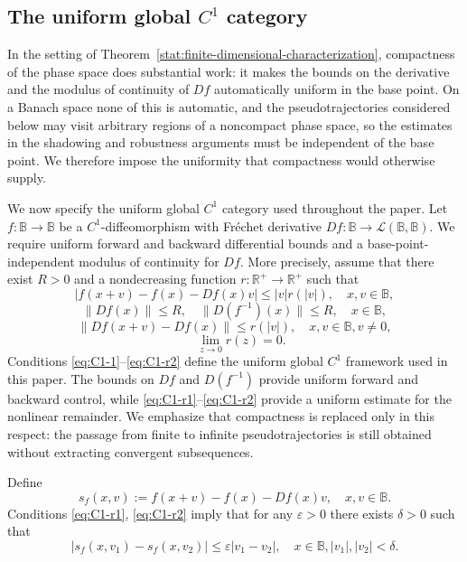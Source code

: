 \documentclass[12pt]{article}
\newcommand{\Bb}{\mathbb{B}}
\newcommand{\Rr}{\mathbb{R}}
\theoremstyle{definition}
\newtheorem{remark}[thm]{Remark}
\begin{document}
\subsection{The uniform global $C^1$ category}

In the setting of Theorem~\ref{stat:finite-dimensional-characterization}, compactness of the phase space does substantial work: it makes the bounds on the derivative and the modulus of continuity of $Df$ automatically uniform in the base point.
On a Banach space none of this is automatic, and the pseudotrajectories considered below may visit arbitrary regions of a noncompact phase space, so the estimates in the shadowing and robustness arguments must be independent of the base point. We therefore impose the uniformity that compactness would otherwise supply.

We now specify the uniform global $C^1$ category used throughout the paper. Let $f:\Bb\to\Bb$ be a $C^1$-diffeomorphism with Fréchet derivative $Df:\Bb\to\mathcal L(\Bb,\Bb)$. We require uniform forward and backward differential bounds and a base-point-independent modulus of continuity for $Df$. More precisely, assume that there exist $R>0$ and a nondecreasing function $r:\Rr^+\to\Rr^+$ such that
\begin{equation}\label{eq:C1-1}
    |f(x+v) - f(x) - Df(x)v| \leq |v|r(|v|), \quad x, v \in \Bb,
\end{equation}
\begin{equation}\label{eq:C1-2}
      \|Df(x)\| \leq R, \quad \|D(f^{-1})(x)\| \leq R, \quad x \in \Bb,
\end{equation}
\begin{equation}\label{eq:C1-r1}
      \|Df(x+v) - Df(x)\| \leq r(|v|),     \quad x, v \in \Bb, v \ne 0,
\end{equation}
\begin{equation}\label{eq:C1-r2}
       \quad \lim_{z \to 0} r(z) = 0.
\end{equation}
Conditions \eqref{eq:C1-1}--\eqref{eq:C1-r2} define the uniform global $C^1$ framework used in this paper. The bounds on $Df$ and $D(f^{-1})$ provide uniform forward and backward control, while \eqref{eq:C1-r1}--\eqref{eq:C1-r2} provide a uniform estimate for the nonlinear remainder. We emphasize that compactness is replaced only in this respect: the passage from finite to infinite pseudotrajectories is still obtained without extracting convergent subsequences.

Define 
$$
s_f(x, v) := f(x+v) - f(x) - Df(x)v, \quad  x, v \in \Bb.
$$
Conditions \eqref{eq:C1-r1}, \eqref{eq:C1-r2} imply that for any $\varepsilon > 0$ there exists $\delta > 0$ such that 
\begin{equation}\label{eq:s-Lip}
    |s_f(x, v_1) - s_f(x, v_2)| \leq \varepsilon |v_1 - v_2|, \quad x \in \mathbb{B}, |v_1|, |v_2| < \delta.
\end{equation}
\end{document}
